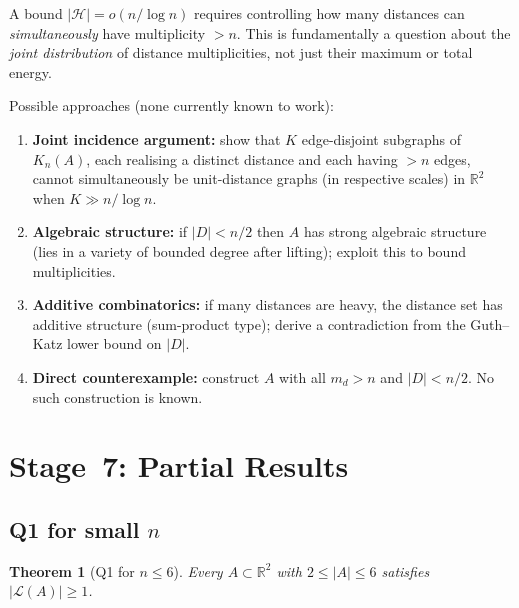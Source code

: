\documentclass[12pt,a4paper]{amsart}
\theoremstyle{plain}
\newtheorem{theorem}{Theorem}[section]
\theoremstyle{definition}
\newcommand{\R}{\mathbb{R}}
\newcommand{\abs}[1]{\left\lvert #1 \right\rvert}
\newcommand{\cL}{\mathcal{L}}
\newcommand{\cH}{\mathcal{H}}
\begin{document}
A bound $\abs{\cH} = o(n/\log n)$ requires controlling how many
distances can \emph{simultaneously} have multiplicity $> n$.
This is fundamentally a question about the \emph{joint distribution}
of distance multiplicities, not just their maximum or total energy.

Possible approaches (none currently known to work):
\begin{enumerate}[label=(\alph*)]
  \item \textbf{Joint incidence argument:} show that $K$ edge-disjoint
        subgraphs of $K_n(A)$, each realising a distinct distance and
        each having $> n$ edges, cannot simultaneously be unit-distance
        graphs (in respective scales) in $\R^2$ when $K \gg n/\log n$.
  \item \textbf{Algebraic structure:} if $\abs{D} < n/2$ then $A$ has
        strong algebraic structure (lies in a variety of bounded degree
        after lifting); exploit this to bound multiplicities.
  \item \textbf{Additive combinatorics:} if many distances are heavy,
        the distance set has additive structure (sum-product type);
        derive a contradiction from the Guth--Katz lower bound on $\abs{D}$.
  \item \textbf{Direct counterexample:} construct $A$ with all $m_d > n$
        and $\abs{D} < n/2$.  No such construction is known.
\end{enumerate}

\section{Stage~7: Partial Results}
\label{sec:partial}

\subsection{Q1 for small $n$}

\begin{theorem}[Q1 for $n \le 6$]
\label{thm:small_n}
Every $A \subset \R^2$ with $2 \le \abs{A} \le 6$ satisfies
$\abs{\cL(A)} \ge 1$.
\end{theorem}
\end{document}
